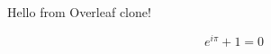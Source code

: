 \documentclass{article}
\begin{document}
Hello from Overleaf clone!

\[
e^{i\pi} + 1 = 0
\]
\end{document}
